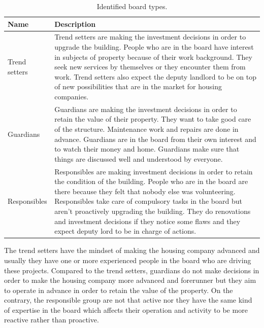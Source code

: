 \begin{table}
\begin{tabular}{|p{2.5cm}|p{9cm}|} 
\hline %
\textbf{Name} & \textbf{Description}  \\ 
\hline 
Trend setters & Trend setters are making the investment decisions in order to upgrade the building. People who are in the board have interest in subjects of property because of their work background. They seek new services by themselves or they encounter them from work. Trend setters also expect the deputy landlord to be on top of new possibilities that are in the market for housing companies. \\ 
\hline
Guardians & Guardians are making the investment decisions in order to retain the value of their property. They want to take good care of the structure. Maintenance work and repairs are done in advance. Guardians are in the board from their own interest and to watch their money and home. Guardians make sure that things are discussed well and understood by everyone. \\  
\hline
Responsibles & Responsibles are making investment decisions in order to retain the condition of the building. People who are in the board are there because they felt that nobody else was volunteering. Responsibles take care of compulsory tasks in the board but aren't proactively upgrading the building. They do renovations and investment decisions if they notice some flaws and they expect deputy lord to be in charge of actions. \\
\hline
\end{tabular} %
\caption{Identified board types.}
\label{table:culturetb}
\end{table} %

The trend setters have the mindset of making the housing company advanced and usually they have one or more experienced people in the board who are driving these projects. Compared to the trend setters, guardians do not make decisions in order to make the housing company more advanced and forerunner but they aim to operate in advance in order to retain the value of the property. On the contrary, the responsible group are not that active nor they have the same kind of expertise in the board which affects their operation and activity to be more reactive rather than proactive.

